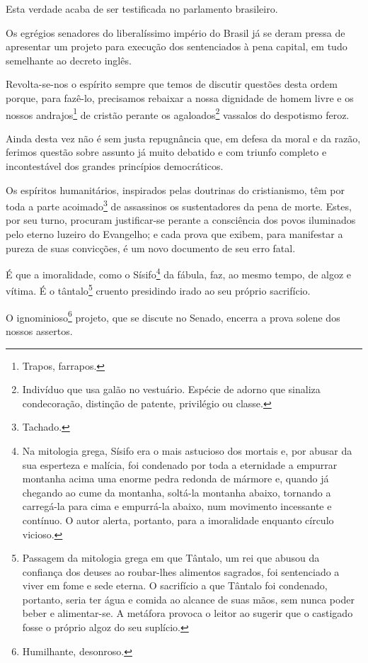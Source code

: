 Esta verdade acaba de ser testificada no parlamento brasileiro.

Os egrégios senadores do liberalíssimo império do Brasil já se deram
pressa de apresentar um projeto para execução dos sentenciados à pena
capital, em tudo semelhante ao decreto inglês.

Revolta-se-nos o espírito sempre que temos de discutir questões desta
ordem porque, para fazê-lo, precisamos rebaixar a nossa dignidade de
homem livre e os nossos andrajos\footnote{Trapos, farrapos.} de
cristão perante os agaloados\footnote{Indivíduo que usa galão no
  vestuário. Espécie de adorno que sinaliza condecoração, distinção de
  patente, privilégio ou classe.} vassalos do despotismo feroz.

Ainda desta vez não é sem justa repugnância que, em defesa da moral e da
razão, ferimos questão sobre assunto já muito debatido e com triunfo
completo e incontestável dos grandes princípios democráticos.

Os espíritos humanitários, inspirados pelas doutrinas do cristianismo,
têm por toda a parte acoimado\footnote{Tachado.} de assassinos os
sustentadores da pena de morte. Estes, por seu turno, procuram
justificar-se perante a consciência dos povos iluminados pelo eterno
luzeiro do Evangelho; e cada prova que exibem, para manifestar a pureza
de suas convicções, é um novo documento de seu erro fatal.

É que a imoralidade, como o Sísifo\footnote{Na mitologia grega, Sísifo
  era o mais astucioso dos mortais e, por abusar da sua esperteza e
  malícia, foi condenado por toda a eternidade a empurrar montanha acima
  uma enorme pedra redonda de mármore e, quando já chegando ao cume da
  montanha, soltá-la montanha abaixo, tornando a carregá-la para cima e
  empurrá-la abaixo, num movimento incessante e contínuo. O autor
  alerta, portanto, para a imoralidade enquanto círculo vicioso.} da
fábula, faz, ao mesmo tempo, de algoz e vítima. É o tântalo\footnote{
  Passagem da mitologia grega em que Tântalo, um rei que abusou da
  confiança dos deuses ao roubar-lhes alimentos sagrados, foi
  sentenciado a viver em fome e sede eterna. O sacrifício a que Tântalo
  foi condenado, portanto, seria ter água e comida ao alcance de suas
  mãos, sem nunca poder beber e alimentar-se. A metáfora provoca o
  leitor ao sugerir que o castigado fosse o próprio algoz do seu
  suplício.} cruento presidindo irado ao seu próprio sacrifício.

O ignominioso\footnote{Humilhante, desonroso.} projeto, que se discute
no Senado, encerra a prova solene dos nossos assertos.

